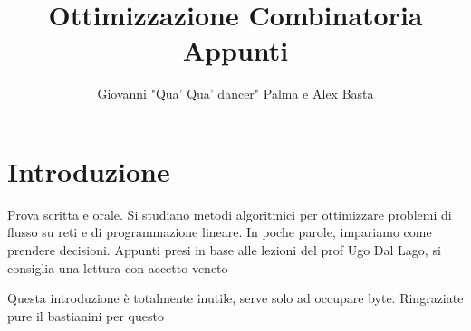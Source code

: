 \documentclass{report}
\title{\Huge{Ottimizzazione Combinatoria}\\Appunti}
\author{\huge{Giovanni "Qua' Qua' dancer" Palma e Alex Basta}}
\date{}
\begin{document}
\maketitle
\newpage%
\tableofcontents

\pagebreak

\chapter{Introduzione}
Prova scritta e orale. Si studiano metodi algoritmici per ottimizzare problemi di flusso su reti e di programmazione lineare. In poche parole, impariamo come prendere decisioni.
Appunti presi in base alle lezioni del prof Ugo Dal Lago, si consiglia una lettura con accetto veneto

Questa introduzione è totalmente inutile, serve solo ad occupare byte. Ringraziate pure il bastianini per questo \faWhatsapp





\end{document}
